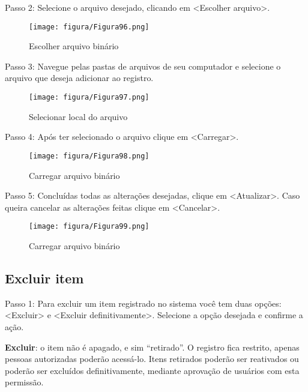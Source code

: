 \documentclass[12pt,hidelinks]{article}
\begin{document}
\newpage
    
    Passo 2: Selecione o arquivo desejado, clicando em <Escolher arquivo>.
    
    \begin{figure}[!htp]
                \centering
                \texttt{[image: figura/Figura96.png]}
                \caption{Escolher arquivo binário}
            \label{Rotulo}
        \end{figure}
    
    Passo 3: Navegue pelas pastas de arquivos de seu computador e selecione o arquivo que deseja adicionar ao registro.
    
    \begin{figure}[!htp]
                \centering
                \texttt{[image: figura/Figura97.png]}
                \caption{Selecionar local do arquivo}
            \label{Rotulo}
        \end{figure}
    
    Passo 4: Após ter selecionado o arquivo clique em <Carregar>.
    
    \begin{figure}[!htp]
                \centering
                \texttt{[image: figura/Figura98.png]}
                \caption{Carregar arquivo binário}
            \label{Rotulo}
        \end{figure}

\newpage
    
    Passo 5: Concluídas todas as alterações desejadas, clique em <Atualizar>. Caso queira cancelar as alterações feitas clique em <Cancelar>.
    
    \begin{figure}[!htp]
                \centering
                \texttt{[image: figura/Figura99.png]}
                \caption{Carregar arquivo binário}
            \label{Rotulo}
        \end{figure}
    
    \subsection{Excluir item}
    
    Passo 1: Para excluir um item registrado no sistema você tem duas opções: <Excluir> e <Excluir definitivamente>. Selecione a opção desejada e confirme a ação.
    
    \singlespacing
     
     \textbf{Excluir}: o item não é apagado, e sim “retirado”. O registro fica restrito, apenas pessoas autorizadas poderão acessá-lo. Itens retirados poderão ser reativados ou poderão ser excluídos definitivamente, mediante aprovação de usuários com esta permissão.
     
\end{document}
